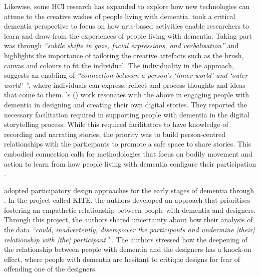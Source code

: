 Likewise, some HCI research has expanded to explore how new technologies can attune to the creative wishes of people living with dementia. \cite{lazar_critical_2017} took a critical dementia perspective to focus on how arts-based activities enable researchers to learn and draw from the experiences of people living with dementia. Taking part was through \textit{``subtle shifts in gaze, facial expressions, and verbalisation''} and highlights the importance of tailoring the creative artefacts such as the brush, canvas and colours to fit the individual. The individuality in the approach, suggests an enabling of \textit{``connection between a person's `inner world' and `outer world' ''}, where individuals can express, reflect and process thoughts and ideas that come to them. \citeauthor{stenhouse2013dangling}'s (\citeyear{stenhouse2013dangling}) work resonates with the above in engaging people with dementia in designing and creating their own digital stories. They reported the necessary facilitation required in supporting people with dementia in the digital storytelling process. While this required facilitators to have knowledge of recording and narrating stories, the priority was to build person-centred relationships with the participants to promote a safe space to share stories. This embodied connection calls for methodologies that focus on bodily movement and action to learn from how people living with dementia configure their participation \citep{morrissey_creative_2015}.

\cite{lindsay_empathy_2012} adopted participatory design approaches for the early stages of dementia through . In the project called KITE, the authors developed an approach that prioritises fostering an empathetic relationship between people with dementia and designers. Through this project, the authors shared uncertainty about how their analysis of the data  \textit{``could, inadvertently, disempower the participants and undermine [their] relationship with [the] participant'' \citep[p.528]{lindsay_empathy_2012}}. The authors stressed how the deepening of the relationship between people with dementia and the designers has a knock-on effect, where people with dementia are hesitant to critique designs for fear of offending one of the designers.

